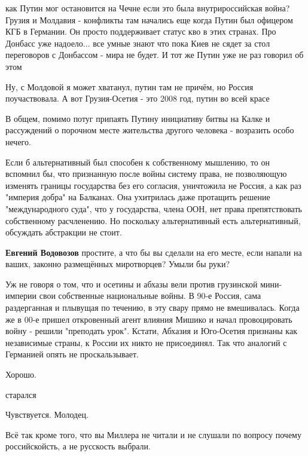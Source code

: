 \begin{itemize}
\begin{itemize}
как Путин мог остановится на Чечне если это была внутрироссийская война? Грузия
и Молдавия - конфликты там начались еще когда Путин был офицером КГБ в
Германии. Он просто поддерживает статус кво в этих странах. Про Донбасс уже
надоело... все умные знают что пока Киев не сядет за стол переговоров с
Донбассом - мира не будет. И тот же Путин уже не раз говорил об этом


Ну, с Молдовой я может хватанул, путин там не причём, но Россия поучаствовала.
А вот Грузия-Осетия - это 2008 год, путин во всей красе


В общем, помимо потуг припаять Путину инициативу битвы на Калке и рассуждений о
порочном месте жительства другого человека - возразить особо нечего.

Если б альтернативный был способен к собственному мышлению, то он вспомнил бы,
что признанную после войны систему права, не позволяющую изменять границы
государства без его согласия, уничтожила не Россия, а как раз "империя добра"
на Балканах. Она ухитрилась даже протащить решение "международного суда", что у
государства, члена ООН, нет права препятствовать собственному расчленению. Но
поскольку альтернативный есть альтернативный, обсуждать абстракции не стоит.

\textbf{Евгений Водовозов} простите, а что бы вы сделали на его месте, если напали на ваших, законно размещённых миротворцев? Умыли бы руки?


Уж не говоря о том, что и осетины и абхазы вели против грузинской мини-империи
свои собственные национальные войны. В 90-е Россия, сама раздерганная и
плывущая по течению, в эту свару прямо не вмешивалась. Когда же в 00-е пришел
откровенный агент влияния Мишико и начал провоцировать войну - решили
"преподать урок". Кстати, Абхазия и Юго-Осетия признаны как независимые страны,
к России их никто не присоединял. Так что аналогий с Германией опять не
проскальзывает.

\end{itemize} %

Хорошо.

\begin{itemize} %
старался

Чувствуется. Молодец.
\end{itemize} %


Всё так кроме того, что вы Миллера не читали и не слушали по вопросу почему
российскойсть, а не русскость выбрали.

\end{itemize} %
